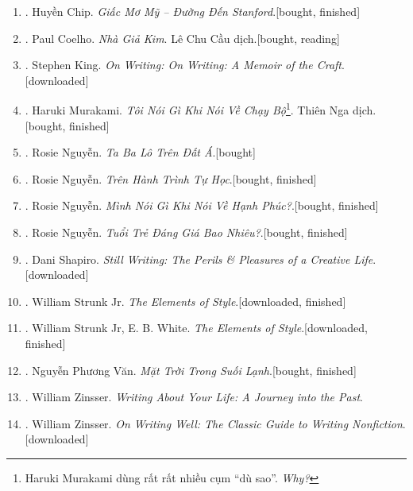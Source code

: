 \documentclass{article}
\begin{document}
\begin{enumerate}
	\item \cite{Chip2018}. Huyền Chip. \textit{Giấc Mơ Mỹ -- Đường Đến Stanford}.\hfill\textsf{[bought, finished]}
	\item \cite{Coelho2023}. Paul Coelho. \textit{Nhà Giả Kim}. Lê Chu Cầu dịch.\hfill\textsf{[bought, reading]}
	\item \cite{King2000, King2010}. Stephen King. \textit{On Writing: On Writing: A Memoir of the Craft}.\hfill\textsf{[downloaded]}
	\item \cite{Murakami2023}. Haruki Murakami. \textit{Tôi Nói Gì Khi Nói Về Chạy Bộ}\footnote{Haruki Murakami dùng rất rất nhiều cụm ``dù sao''. \textit{Why?}}. Thiên Nga dịch.\hfill\textsf{[bought, finished]}
	\item \cite{Rosie2021a}. Rosie Nguyễn. \textit{Ta Ba Lô Trên Đất Á}.\hfill\textsf{[bought]}
	\item \cite{Rosie2021b}. Rosie Nguyễn. \textit{Trên Hành Trình Tự Học}.\hfill\textsf{[bought, finished]}
	\item \cite{Rosie2022a}. Rosie Nguyễn. \textit{Mình Nói Gì Khi Nói Về Hạnh Phúc?}.\hfill\textsf{[bought, finished]}
	\item \cite{Rosie2022b}. Rosie Nguyễn. \textit{Tuổi Trẻ Đáng Giá Bao Nhiêu?}.\hfill\textsf{[bought, finished]}
	\item \cite{Shapiro2014}. Dani Shapiro. \textit{Still Writing: The Perils \& Pleasures of a Creative Life}.\hfill\textsf{[downloaded]}
	\item \cite{Strunk1918}. William Strunk Jr. \textit{The Elements of Style}.\hfill\textsf{[downloaded, finished]}
	\item \cite{Strunk_White2019}. William Strunk Jr, E. B. White. \textit{The Elements of Style}.\hfill\textsf{[downloaded, finished]}
	\item \cite{Van2022}. Nguyễn Phương Văn. \textit{Mặt Trời Trong Suối Lạnh}.\hfill\textsf{[bought, finished]}
	\item \cite{Zinsser2005}. William Zinsser. \textit{Writing About Your Life: A Journey into the Past}.
	\item \cite{Zinsser2016}. William Zinsser. \textit{On Writing Well: The Classic Guide to Writing Nonfiction}.\hfill\textsf{[downloaded]}
\end{enumerate}

\end{document}
